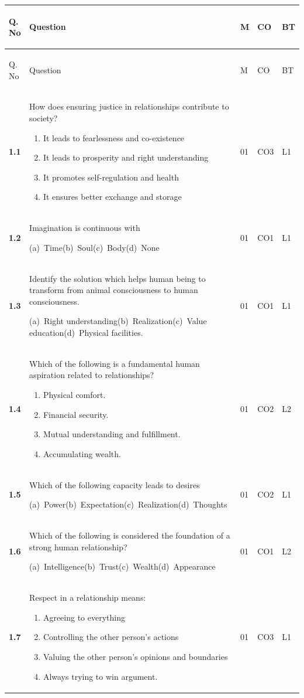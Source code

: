\documentclass[11pt,a4paper,oneside]{book}
\newcommand{\optsinline}[4]{\par\vspace{3pt}%
  {\small\color{slate}(a)~#1\quad (b)~#2\quad (c)~#3\quad (d)~#4}}
\newenvironment{optlist}
  {\par\vspace{2pt}\begingroup\small\color{slate}%
   \begin{enumerate}[label={\color{slatelight}(\alph*)},leftmargin=2.0em,
     itemsep=1pt,topsep=2pt,parsep=0pt]}
  {\end{enumerate}\endgroup\vspace{1pt}}
\newcommand{\hdr}[1]{{\sffamily\bfseries\color{white}\strut #1}}
\newenvironment{qtable}
  {\renewcommand{\arraystretch}{1.28}%
   \arrayrulecolor{rulegrey}%
   \setlength{\LTpre}{6pt}\setlength{\LTpost}{4pt}%
   \begin{longtable}{C{11mm} P{108mm} C{10mm} C{12mm} C{9mm}}
   \rowcolor{slate}
   \hdr{Q.\,No} & \hdr{Question} & \hdr{M} & \hdr{CO} & \hdr{BT}
   \\ \hline \endfirsthead
   \rowcolor{slate}
   \hdr{Q.\,No} & \hdr{Question} & \hdr{M} & \hdr{CO} & \hdr{BT}
   \\ \hline \endhead}
  {\end{longtable}}
\newcommand{\qn}[1]{{\sffamily\bfseries\color{ocre}#1}}
\begin{document}
\begin{qtable}
\qn{1.1} & How does ensuring justice in relationships contribute to society?
  \begin{optlist}
  \item It leads to fearlessness and co-existence
  \item It leads to prosperity and right understanding
  \item It promotes self-regulation and health
  \item It ensures better exchange and storage
  \end{optlist}
  & 01 & CO3 & L1 \\ \hline
\qn{1.2} & Imagination is continuous with
  \optsinline{Time}{Soul}{Body}{None}
  & 01 & CO1 & L1 \\ \hline
\qn{1.3} & Identify the solution which helps human being to transform from
  animal consciousness to human consciousness.
  \optsinline{Right understanding}{Realization}{Value education}%
  {Physical facilities.}
  & 01 & CO1 & L1 \\ \hline
\qn{1.4} & Which of the following is a fundamental human aspiration related to
  relationships?
  \begin{optlist}
  \item Physical comfort.
  \item Financial security.
  \item Mutual understanding and fulfillment.
  \item Accumulating wealth.
  \end{optlist}
  & 01 & CO2 & L2 \\ \hline
\qn{1.5} & Which of the following capacity leads to desires
  \optsinline{Power}{Expectation}{Realization}{Thoughts}
  & 01 & CO2 & L1 \\ \hline
\qn{1.6} & Which of the following is considered the foundation of a strong
  human relationship?
  \optsinline{Intelligence}{Trust}{Wealth}{Appearance}
  & 01 & CO1 & L2 \\ \hline
\qn{1.7} & Respect in a relationship means:
  \begin{optlist}
  \item Agreeing to everything
  \item Controlling the other person's actions
  \item Valuing the other person's opinions and boundaries
  \item Always trying to win argument.
  \end{optlist}
  & 01 & CO3 & L1 \\ \hline

\end{qtable}
\end{document}
